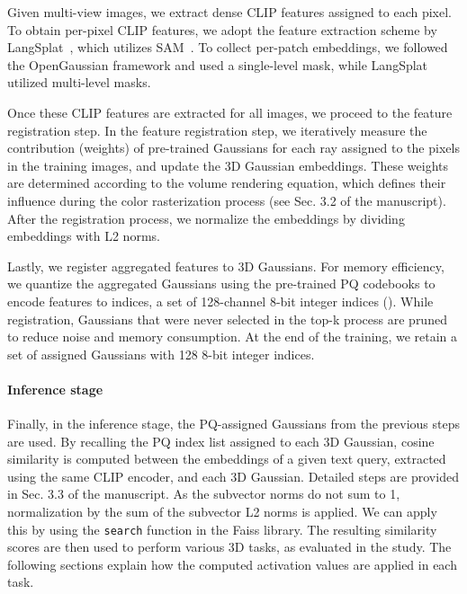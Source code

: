 Given multi-view images, we extract dense CLIP features assigned to each pixel. 
To obtain per-pixel CLIP features, we adopt the feature extraction scheme by LangSplat~\cite{langsplat}, which utilizes SAM~\cite{sam}. To collect per-patch embeddings, we followed the OpenGaussian framework and used a single-level mask, while LangSplat utilized multi-level masks. 

Once these CLIP features are extracted for all images, we proceed to the feature registration step.
In the feature registration step, we iteratively measure the contribution (weights) of pre-trained Gaussians for each ray assigned to the pixels in the training images, and update the 3D Gaussian embeddings. 
These weights are determined according to the volume rendering equation, which defines their influence during the color rasterization process (see Sec. 3.2 of the manuscript). After the registration process, we normalize the embeddings by dividing embeddings with L2 norms.

Lastly, we register aggregated features to 3D Gaussians. For memory efficiency, we quantize the aggregated Gaussians using the pre-trained PQ codebooks to encode features to indices, a set of 128-channel 8-bit integer indices (). While registration, Gaussians that were never selected in the top-k process are pruned to reduce noise and memory consumption. At the end of the training, we retain a set of assigned Gaussians with 128 8-bit integer indices.


\paragraph{Inference stage}
Finally, in the inference stage, the PQ-assigned Gaussians from the previous steps are used. By recalling the PQ index list assigned to each 3D Gaussian, cosine similarity is computed between the embeddings of a given text query, extracted using the same CLIP encoder, and each 3D Gaussian. Detailed steps are provided in Sec. 3.3 of the manuscript. As the subvector norms do not sum to 1, normalization by the sum of the subvector L2 norms is applied. We can apply this by using the \texttt{search} function in the Faiss library. The resulting similarity scores are then used to perform various 3D tasks, as evaluated in the study. The following sections explain how the computed activation values are applied in each task.

